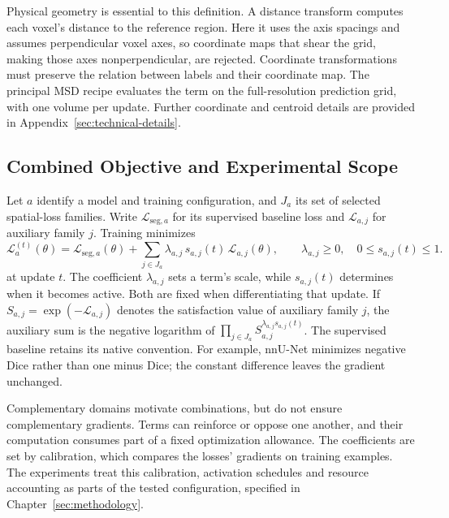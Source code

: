 \documentclass[12pt,a4paper]{article}
\begin{document}
Physical geometry is essential to this definition. A distance transform
computes each voxel's distance to the reference region. Here it uses the
axis spacings and assumes perpendicular voxel axes, so coordinate maps that
shear the grid, making those axes nonperpendicular, are rejected. Coordinate
transformations must preserve the relation between labels and their
coordinate map. The principal MSD recipe evaluates the term on the
full-resolution prediction grid, with one volume per update. Further
coordinate and centroid details are provided in
Appendix~\ref{sec:technical-details}.

\subsection{Combined Objective and Experimental Scope}
\label{sec:constraint-combination}

Let $a$ identify a model and training configuration, and $J_a$ its set
of selected spatial-loss families. Write $\mathcal L_{\mathrm{seg},a}$
for its supervised baseline loss and $\mathcal L_{a,j}$ for auxiliary
family $j$. Training minimizes
\begin{equation}
\mathcal{L}_{a}^{(t)}(\theta)
=\mathcal{L}_{\mathrm{seg},a}(\theta)
+\sum_{j\in J_a}\lambda_{a,j}\,s_{a,j}(t)\,
\mathcal{L}_{a,j}(\theta),
\qquad \lambda_{a,j}\geq0,\quad 0\leq s_{a,j}(t)\leq1.
\label{eq:scheduled-constraint-objective}
\end{equation}
at update $t$. The coefficient $\lambda_{a,j}$ sets a term's scale,
while $s_{a,j}(t)$ determines when it becomes active. Both are fixed
when differentiating that update. If
$S_{a,j}=\exp(-\mathcal L_{a,j})$ denotes the satisfaction value of
auxiliary family $j$, the auxiliary sum is the negative
logarithm of
$\prod_{j\in J_a}S_{a,j}^{\lambda_{a,j}s_{a,j}(t)}$.
The supervised baseline retains its native convention. For example,
nnU-Net minimizes negative Dice rather than one minus Dice; the constant
difference leaves the gradient unchanged.

Complementary domains motivate combinations, but do not ensure complementary
gradients. Terms can reinforce or oppose one another, and their computation
consumes part of a fixed optimization allowance. The coefficients are set by
calibration, which compares the losses' gradients on training examples. The
experiments treat this calibration, activation schedules and resource
accounting as parts of the tested configuration, specified in
Chapter~\ref{sec:methodology}.
\end{document}
